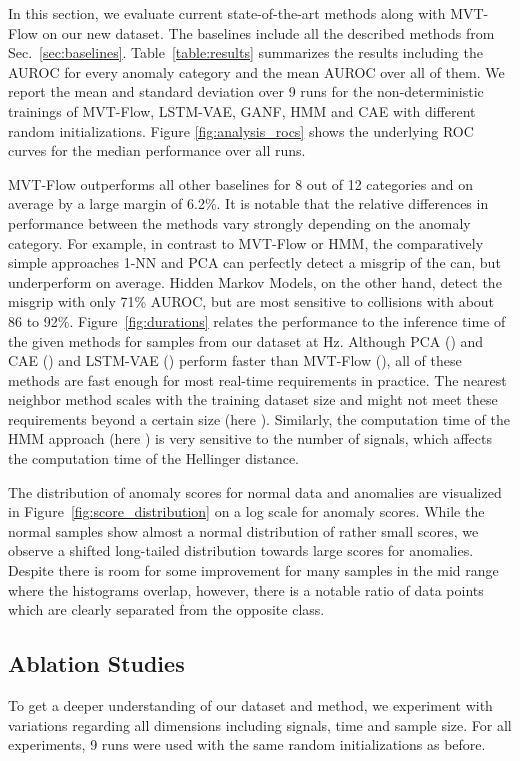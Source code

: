 \documentclass[journal]{IEEEtran}
\begin{document}
In this section, we evaluate current state-of-the-art methods along with MVT-Flow on our new dataset.
The baselines include all the described methods from Sec.~\ref{sec:baselines}.
Table~\ref{table:results} summarizes the results including the AUROC for every anomaly category and the mean AUROC over all of them.
We report the mean and standard deviation over 9 runs {for the non-deterministic trainings of MVT-Flow, LSTM-VAE, GANF, HMM and CAE with different random initializations.}
Figure \ref{fig:analysis_rocs} shows the underlying ROC curves for the median performance over all runs.

{MVT-Flow outperforms all other baselines for 8 out of 12 categories and {on average} by a large margin of 6.2\%.
It is notable that the relative differences in performance between the methods vary strongly depending on the anomaly category.
For example, in contrast to MVT-Flow or HMM, the comparatively simple approaches 1-NN and PCA can perfectly detect a misgrip of the can, but underperform on average.
Hidden Markov Models, on the other hand, detect the misgrip with only 71\% AUROC, but are most sensitive to collisions with about 86 to 92\%.
\newcommand\ms{\text{ }\mathrm{ms}}
Figure~\ref{fig:durations} relates the performance to the inference time of the given methods for samples from our dataset at  Hz.
Although PCA () and CAE () and LSTM-VAE () perform faster than MVT-Flow (), all of these methods are fast enough for most real-time requirements in practice.
The nearest neighbor method scales with the training dataset size and might not meet these requirements beyond a certain size (here ).
Similarly, the computation time of the HMM approach (here ) is very sensitive to the number of signals, which affects the computation time of the Hellinger distance.}

The distribution of anomaly scores for normal data and anomalies are visualized in Figure~\ref{fig:score_distribution} on a log scale for anomaly scores.
While the normal samples show almost a normal distribution of rather small scores, we observe a shifted long-tailed distribution towards large scores for anomalies.
Despite there is room for some improvement for many samples in the mid range where the histograms overlap, however, there is a notable ratio of data points which are clearly separated from the opposite class.



\subsection{Ablation Studies}
\label{ablations}
To get a deeper understanding of our dataset and method, we experiment with variations regarding all dimensions including signals, time and sample size.
For all experiments, 9 runs were used with the same random initializations as before.
\end{document}
